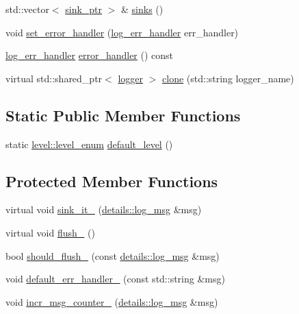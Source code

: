 \begin{DoxyCompactItemize}
\item 
std\+::vector$<$ \hyperlink{namespacespdlog_a422c57d3088160b517e5a74e5f318253}{sink\+\_\+ptr} $>$ \& \hyperlink{classspdlog_1_1logger_a7d93aa2653b924f2c9981d026aea9822}{sinks} ()
\item 
void \hyperlink{classspdlog_1_1logger_aeeb9d71caa8f357f4255447fb72135d3}{set\+\_\+error\+\_\+handler} (\hyperlink{namespacespdlog_ad3ed787a29f245c833ef66faf48036e2}{log\+\_\+err\+\_\+handler} err\+\_\+handler)
\item 
\hyperlink{namespacespdlog_ad3ed787a29f245c833ef66faf48036e2}{log\+\_\+err\+\_\+handler} \hyperlink{classspdlog_1_1logger_ac6c864952112a3bbe4084884cc1d64a1}{error\+\_\+handler} () const
\item 
virtual std\+::shared\+\_\+ptr$<$ \hyperlink{classspdlog_1_1logger}{logger} $>$ \hyperlink{classspdlog_1_1logger_a649a3c1a1b380e2488a93f9c3ae694de}{clone} (std\+::string logger\+\_\+name)
\end{DoxyCompactItemize}
\subsection*{Static Public Member Functions}
\begin{DoxyCompactItemize}
\item 
static \hyperlink{namespacespdlog_1_1level_a35f5227e5daf228d28a207b7b2aefc8b}{level\+::level\+\_\+enum} \hyperlink{classspdlog_1_1logger_a0d0307a6501a9f56689c386a006991fe}{default\+\_\+level} ()
\end{DoxyCompactItemize}
\subsection*{Protected Member Functions}
\begin{DoxyCompactItemize}
\item 
virtual void \hyperlink{classspdlog_1_1logger_a43ac8d73671a109cba253eadb0b049e2}{sink\+\_\+it\+\_\+} (\hyperlink{structspdlog_1_1details_1_1log__msg}{details\+::log\+\_\+msg} \&msg)
\item 
virtual void \hyperlink{classspdlog_1_1logger_a98981b19089a6000fdfa8765af52ef0e}{flush\+\_\+} ()
\item 
bool \hyperlink{classspdlog_1_1logger_aa1bbe703cdeed2aef722a97a2bc1a800}{should\+\_\+flush\+\_\+} (const \hyperlink{structspdlog_1_1details_1_1log__msg}{details\+::log\+\_\+msg} \&msg)
\item 
void \hyperlink{classspdlog_1_1logger_a3432e21bdc19d74024b57cc3f26a8471}{default\+\_\+err\+\_\+handler\+\_\+} (const std\+::string \&msg)
\item 
void \hyperlink{classspdlog_1_1logger_a55bf9c5c960391a56399b5f1ea601b4b}{incr\+\_\+msg\+\_\+counter\+\_\+} (\hyperlink{structspdlog_1_1details_1_1log__msg}{details\+::log\+\_\+msg} \&msg)
\end{DoxyCompactItemize}
